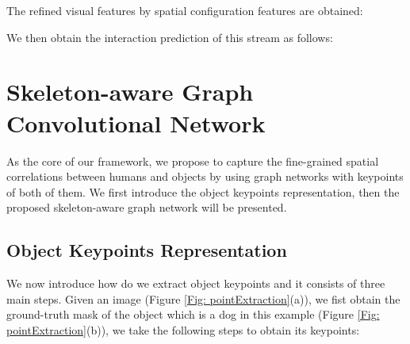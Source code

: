\documentclass[a4paper, 10pt, conference]{IEEEtran}
\begin{document}
The refined visual features by spatial configuration features are obtained:


We then obtain the interaction prediction  of this stream as follows:



\section{Skeleton-aware Graph Convolutional Network}
\label{SpatialSkeletonStream}
As the core of our framework, we propose to capture the fine-grained spatial correlations between humans and objects by using graph networks with keypoints of both of them. We first introduce the object keypoints representation, then the proposed skeleton-aware graph network will be presented. 

\subsection{Object Keypoints Representation}
\label{PoinExtra}
We now introduce how do we extract object keypoints and it consists of three main steps. Given an image (Figure \ref{Fig: pointExtraction}(a)), we fist obtain the ground-truth mask of the object which is a dog in this example (Figure \ref{Fig: pointExtraction}(b)), we take the following steps to obtain its keypoints:
\end{document}
